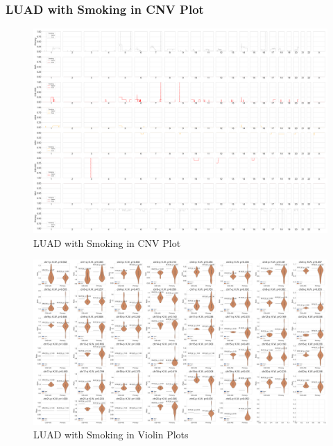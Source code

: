 \documentclass{beamer}
\begin{document}
    \begin{frame}[allowframebreaks]
        \frametitle{LUAD with Smoking in CNV Plot}

        \begin{figure}
            \includegraphics[width=0.6 \linewidth]{figures/PureCN/BWA-simple-ADC.Smoking.pdf}
            \caption{LUAD with Smoking in CNV Plot}
        \end{figure}

        \begin{figure}
            \includegraphics[width=0.8 \linewidth]{figures/PureCN/BWA-violin-ADC.Smoking.pdf}
            \caption{LUAD with Smoking in Violin Plots}
        \end{figure}
    \end{frame}
\end{document}
